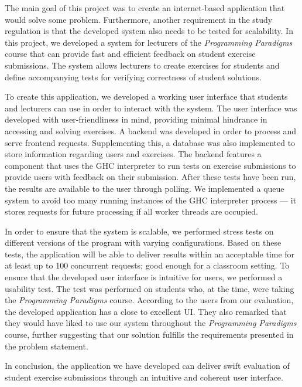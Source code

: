 The main goal of this project was to create an internet-based application that would solve some problem.
Furthermore, another requirement in the study regulation is that the developed system also needs to be tested for scalability.
In this project, we developed a system for lecturers of the \textit{Programming Paradigms} course that can provide fast and efficient feedback on student exercise submissions.
The system allows lecturers to create exercises for students and define accompanying tests for verifying correctness of student solutions.

To create this application, we developed a working user interface that students and lecturers can use in order to interact with the system.
The user interface was developed with user-friendliness in mind, providing minimal hindrance in accessing and solving exercises.
A backend was developed in order to process and serve frontend requests.
Supplementing this, a database was also implemented to store information regarding users and exercises.
The backend features a component that uses the GHC interpreter to run tests on exercise submissions to provide users with feedback on their submission.
After these tests have been run, the results are available to the user through polling.
We implemented a queue system to avoid too many running instances of the GHC interpreter process --- it stores requests for future processing if all worker threads are occupied.

In order to ensure that the system is scalable, we performed stress tests on different versions of the program with varying configurations.
Based on these tests, the application will be able to deliver results within an acceptable time for at least up to 100 concurrent requests; good enough for a classroom setting.
To ensure that the developed user interface is intuitive for users, we performed a usability test.
The test was performed on students who, at the time, were taking the \textit{Programming Paradigms} course.
According to the users from our evaluation, the developed application has a close to excellent UI.
They also remarked that they would have liked to use our system throughout the \textit{Programming Paradigms} course, further suggesting that our solution fulfills the requirements presented in the problem statement.

In conclusion, the application we have developed can deliver swift evaluation of student exercise submissions through an intuitive and coherent user interface.